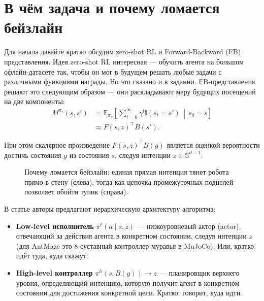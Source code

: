 \section{В чём задача и почему ломается бейзлайн}

Для начала давайте кратко обсудим zero-shot RL и Forward-Backward (FB) представления. Идея zero-shot RL интересная --- обучить агента на большом офлайн-датасете так, чтобы он мог в будущем решать любые задачи с различными функциями награды. Но это сказано и в задании.
FB-представления решают это следующим образом --- они раскладывают меру будущих посещений на две компоненты:
\begin{equation}
\label{eq:fb_factorization}
\begin{split}
    M^{\pi_z}(s, s') &= \mathbb{E}_{\pi_z} \!\left[ \sum_{t=0}^\infty \gamma^t \mathbb{I}(s_t = s') \,\middle|\, s_0 = s \right] \\
    &\approx F(s, z)^\top B(s').
\end{split}
\end{equation}

При этом скалярное произведение $F(s, z)^\top B(g)$ является оценкой вероятности достичь состояния $g$ из состояния $s$, следуя интенции $z \in \mathbb{S}^{d-1}$.

\begin{figure}[H]
    \centering
    
    \caption{Почему ломается бейзлайн: единая прямая интенция тянет робота прямо в стену (слева), тогда как цепочка промежуточных подцелей позволяет обойти тупик (справа).}
    \label{fig:single_vs_multi}
\end{figure}

В статье \cite{stojanovic2026switching} авторы предлагают иерархическую архитектуру алгоритма:
\begin{itemize}[leftmargin=*,noitemsep]
    \item \textbf{Low-level исполнитель} $\pi^\ell(a \mid s, z)$ --- низкоуровневый актор (actor), отвечающий за действия агента в конкретном состоянии, следуя интенции $z$ (для AntMaze это 8-суставный контроллер муравья в MuJoCo). Или, кратко: идёт туда, куда скажут.
    \item \textbf{High-level контроллер} $\pi^h(s, B(g)) \to z$ --- планировщик верхнего уровня, определяющий интенцию, которую получит агент в конкретном состоянии для достижения конкретной цели. Кратко: говорит, куда идти.
\end{itemize}

